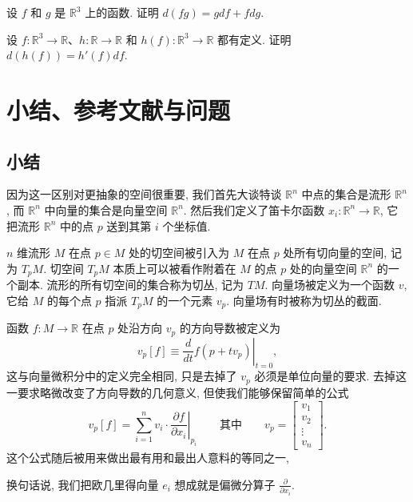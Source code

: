 \begin{question}\label{q:2-16}
设 $f$ 和 $g$ 是 $\mathbb{R}^3$ 上的函数. 证明 $d(fg)=gdf+fdg$.
\end{question}

\begin{question}\label{q:2-17}
设 $f:\mathbb{R}^3\to\mathbb{R}$、$h:\mathbb{R}\to\mathbb{R}$ 和 $h(f):\mathbb{R}^3\to\mathbb{R}$ 都有定义. 证明 $d(h(f))=h'(f)df$.
\end{question}

\section{小结、参考文献与问题}

\subsection{小结}

因为这一区别对更抽象的空间很重要, 我们首先大谈特谈 $\mathbb{R}^n$ 中点的集合是流形 $\mathbb{R}^n$, 而 $\mathbb{R}^n$ 中向量的集合是向量空间 $\mathbb{R}^n$. 然后我们定义了笛卡尔函数 $x_i:\mathbb{R}^n\to\mathbb{R}$, 它把流形 $\mathbb{R}^n$ 中的点 $p$ 送到其第 $i$ 个坐标值.

$n$ 维流形 $M$ 在点 $p\in M$ 处的切空间被引入为 $M$ 在点 $p$ 处所有切向量的空间, 记为 $T_pM$. 切空间 $T_pM$ 本质上可以被看作附着在 $M$ 的点 $p$ 处的向量空间 $\mathbb{R}^n$ 的一个副本. 流形的所有切空间的集合称为切丛, 记为 $TM$. 向量场被定义为一个函数 $v$, 它给 $M$ 的每个点 $p$ 指派 $T_pM$ 的一个元素 $v_p$. 向量场有时被称为切丛的截面.

函数 $f:M\to\mathbb{R}$ 在点 $p$ 处沿方向 $v_p$ 的方向导数被定义为
\[
v_p[f]\equiv\left.\frac{d}{dt}f(p+tv_p)\right|_{t=0},
\]
这与向量微积分中的定义完全相同, 只是去掉了 $v_p$ 必须是单位向量的要求. 去掉这一要求略微改变了方向导数的几何意义, 但使我们能够保留简单的公式
\[
v_p[f]=\sum_{i=1}^{n}v_i\cdot\left.\frac{\partial f}{\partial x_i}\right|_{p_i}\qquad\text{其中}\qquad
v_p=\begin{bmatrix}v_1\\v_2\\\vdots\\v_n\end{bmatrix}.
\]
这个公式随后被用来做出最有用和最出人意料的等同之一, 
\begin{center}
\end{center}
换句话说, 我们把欧几里得向量 $e_i$ 想成就是偏微分算子 $\frac{\partial}{\partial x_i}$.


